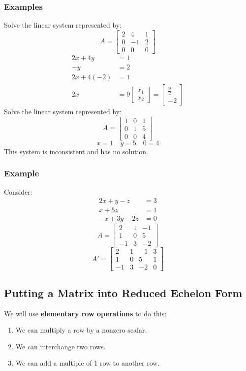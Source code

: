 \documentclass[letterpaper, 12pt]{math}
\begin{document}
\subsubsection*{Examples}
Solve the linear system represented by:
\[ A = \left[\begin{array}{cc|c}
  2 & 4 & 1 \\
  0 & -1 & 2 \\
  0 & 0 & 0
\end{array}\right] \]
\begin{align*}
  2x+4y &= 1 \\
  -y &= 2 \\
  2x+4(-2) &= 1 \\
  2x &= 9
  \begin{bmatrix}x_1 \\ x_2\end{bmatrix} = \begin{bmatrix}
    \frac{9}{2} \\ -2
  \end{bmatrix}
\end{align*}
Solve the linear system represented by:
\[ A = \left[\begin{array}{cc|c}
  1 & 0 & 1 \\
  0 & 1 & 5 \\
  0 & 0 & 4
\end{array}\right] \]
\[ x = 1 \quad y = 5 \quad 0 = 4 \]
This system is inconsistent and has no solution.

\subsubsection*{Example}
Consider:
\begin{align*}
  2x+y-z &= 3 \\
  x+5z &= 1\\
  -x+3y-2z &= 0
\end{align*}
\[ A = \begin{bmatrix}
  2 & 1 & -1 \\
  1 & 0 & 5 \\
  -1 & 3 & -2
\end{bmatrix} \]
\[ A' = \left[\begin{array}{ccc|c}
  2 & 1 & -1 & 3 \\
  1 & 0 & 5 & 1 \\
  -1 & 3 & -2 & 0
\end{array}\right] \]

\subsection*{Putting a Matrix into Reduced Echelon Form}
We will use \textbf{elementary row operations} to do this:
\begin{enumerate}
  \item We can multiply a row by a nonzero scalar.
  \item We can interchange two rows.
  \item We can add a multiple of 1 row to another row.
\end{enumerate}
\end{document}
